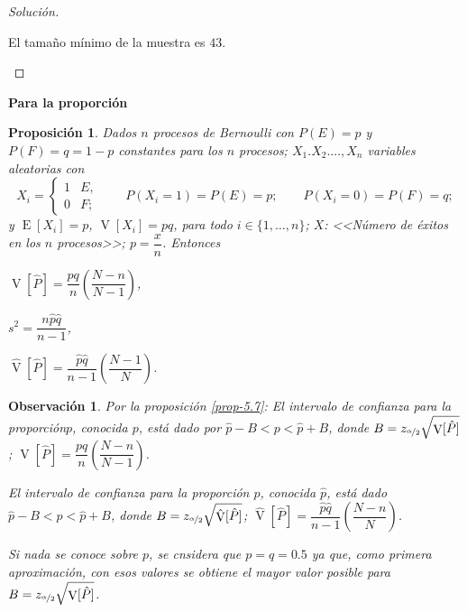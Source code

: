 \documentclass[a5paper,doc,10pt,noapacite]{apa6}
\DeclareMathOperator{\Esp}{E}
\DeclareMathOperator{\Var}{V}
\newtheorem{proposicion}{Proposición}
\newtheorem{observ}{Observación}
\newcommand{\neodefi}[1]{%
	\vspace{1\baselineskip}
	\textbf{\small#1} \newline
}
\begin{document}
{{\begin{proof}[Solución]
\begin{APAenumerate}
	
	El tamaño mínimo de la muestra es \(43\).			\qedhere
	\end{APAenumerate}
\end{proof}


\neodefi{Para la proporción}


\begin{proposicion}\label{prop-5.7}
	Dados \(n\) procesos de Bernoulli con \(P(E)=p\) y \(P(F)=q=1-p\) constantes para los \(n\) procesos; \(X_1.X_2.\ldots,X_n\) variables aleatorias con
	\[
	X_i=\begin{cases} 1 & E,\\ 0 & F;\end{cases}
	\qquad
	P(X_i=1)=P(E)=p;
	\qquad
	P(X_i=0)=P(F)=q;
\]
y \(\Esp[X_i]=p\), \(\Var[X_i]=pq\), para todo \(i \in \{1,\ldots,n\}\); \(X\): <<Número de éxitos en los \(n\) procesos>>; \(p=\dfrac{x}{n}\). Entonces
	\begin{APAenumerate}
		\item \(\Var[\hat{P}]=\dfrac{pq}{n}\left(\dfrac{N-n}{N-1}\right)\),
		\item \(s^2=\dfrac{n\hat{p}\hat{q}}{n-1}\),
		\item \(\hat{\Var}[\hat{P}]=\dfrac{\hat{p}\hat{q}}{n-1}\left(\dfrac{N-1}{N}\right)\).
	\end{APAenumerate}
\end{proposicion}

\begin{observ}
	Por la proposición \eqref{prop-5.7}: El intervalo de confianza para la proporción\(p\), conocida \(p\), está dado por \(\hat{p}-B<p<\hat{p}+B\), donde \(B=z_{\nicefrac{\alpha}{2}}\sqrt{\Var[\hat{P}]}\); \(\Var[\hat{P}]=\dfrac{pq}{n}\left(\dfrac{N-n}{N-1}\right)\).
	
	El intervalo de confianza para la proporción \(p\), conocida \(\hat{p}\), está dado \(\hat{p}-B<p<\hat{p}+B\), donde \(B=z_{\nicefrac{\alpha}{2}}\sqrt{\hat{\Var}[\hat{P}]}\); \(\hat{\Var}[\hat{P}]=\dfrac{\hat{p}\hat{q}}{n-1}\left(\dfrac{N-n}{N}\right)\).
	
	Si nada se conoce sobre \(p\), se cnsidera que \(p=q=0.5\) ya que, como primera aproximación, con esos valores se obtiene el mayor valor posible para \(B=z_{\nicefrac{\alpha}{2}}\sqrt{\Var[\hat{P}]}\).
\end{observ}



}}
\end{document}
